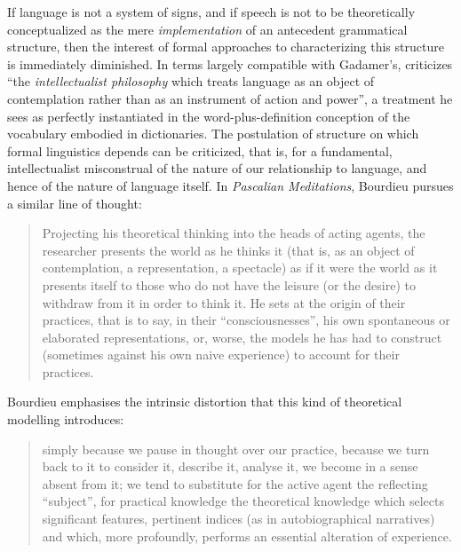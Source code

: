 \documentclass[output=paper]{langscibook}
\begin{document}
If language is not a system of signs, and if speech is not to be theoretically conceptualized as the mere \emph{implementation} of an antecedent grammatical structure, then the interest of formal approaches to characterizing this structure is immediately diminished. In terms largely compatible with Gadamer's, \citet[37]{Bourdieu1991} criticizes ``the \emph{intellectualist philosophy} which treats language as an object of contemplation rather than as an instrument of action and power'', a treatment he sees as perfectly instantiated in the word-plus-definition conception of the vocabulary embodied in dictionaries. The postulation of structure on which formal linguistics depends can be criticized, that is, for a fundamental, intellectualist misconstrual of the nature of our relationship to language, and hence of the nature of language itself. In \emph{Pascalian Meditations}, Bourdieu pursues a similar line of thought:

\begin{quotation}
Projecting his theoretical thinking into the heads of acting agents, the researcher presents the world as he thinks it (that is, as an object of contemplation, a representation, a spectacle) as if it were the world as it presents itself to those who do not have the leisure (or the desire) to withdraw from it in order to think it. He sets at the origin of their practices, that is to say, in their ``consciousnesses'', his own spontaneous or elaborated representations, or, worse, the models he has had to construct (sometimes against his own naive experience) to account for their practices. \citep[51]{Bourdieu20031997}
\end{quotation}

Bourdieu emphasises the intrinsic distortion that this kind of theoretical modelling introduces:

\begin{quotation}
simply because we pause in thought over our practice, because we turn back to it to consider it, describe it, analyse it, we become in a sense absent from it; we tend to substitute for the active agent the reflecting ``subject'', for practical knowledge the theoretical knowledge which selects significant features, pertinent indices (as in autobiographical narratives) and which, more profoundly, performs an essential alteration of experience. \citep[51-52]{Bourdieu20031997}
\end{quotation}
\end{document}
